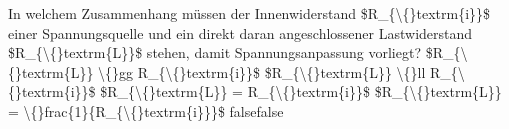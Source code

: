     {In welchem Zusammenhang müssen der Innenwiderstand \$R\_\{\textbackslash\{\}textrm\{i\}\}\$ einer Spannungsquelle und ein direkt daran angeschlossener Lastwiderstand \$R\_\{\textbackslash\{\}textrm\{L\}\}\$ stehen, damit Spannungsanpassung vorliegt?}
    {\$R\_\{\textbackslash\{\}textrm\{L\}\} \textbackslash\{\}gg R\_\{\textbackslash\{\}textrm\{i\}\}\$}
    {\$R\_\{\textbackslash\{\}textrm\{L\}\} \textbackslash\{\}ll R\_\{\textbackslash\{\}textrm\{i\}\}\$}
    {\$R\_\{\textbackslash\{\}textrm\{L\}\} = R\_\{\textbackslash\{\}textrm\{i\}\}\$}
    {\$R\_\{\textbackslash\{\}textrm\{L\}\} = \textbackslash\{\}frac\{1\}\{R\_\{\textbackslash\{\}textrm\{i\}\}\}\$}
    {false}{false}